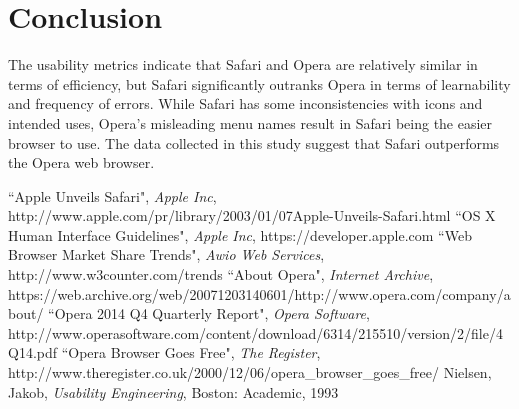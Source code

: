 \documentclass{article}
\begin{document}
\section{Conclusion} The usability metrics indicate that Safari and Opera are relatively similar in terms of efficiency, but Safari significantly outranks Opera in terms of learnability and frequency of errors. While Safari has some inconsistencies with icons and intended uses, Opera's misleading menu names result in Safari being the easier browser to use. The data collected in this study suggest that Safari outperforms the Opera web browser.

\clearpage

\begin{thebibliography}{100}

 ``Apple Unveils Safari", \emph{Apple Inc}, http://www.apple.com/pr/library/2003/01/07Apple-Unveils-Safari.html
 ``OS X Human Interface Guidelines", \emph{Apple Inc}, https://developer.apple.com
 ``Web Browser Market Share Trends", \emph{Awio Web Services}, http://www.w3counter.com/trends
 ``About Opera", \emph{Internet Archive}, https://web.archive.org/web/20071203140601/http://www.opera.com/company/about/
 ``Opera 2014 Q4 Quarterly Report", \emph{Opera Software}, http://www.operasoftware.com/content/download/6314/215510/version/2/file/4Q14.pdf
 ``Opera Browser Goes Free", \emph{The Register}, http://www.theregister.co.uk/2000/12/06/opera\_browser\_goes\_free/
 Nielsen, Jakob, \emph{Usability Engineering}, Boston: Academic, 1993

\end{thebibliography}
\end{document}
